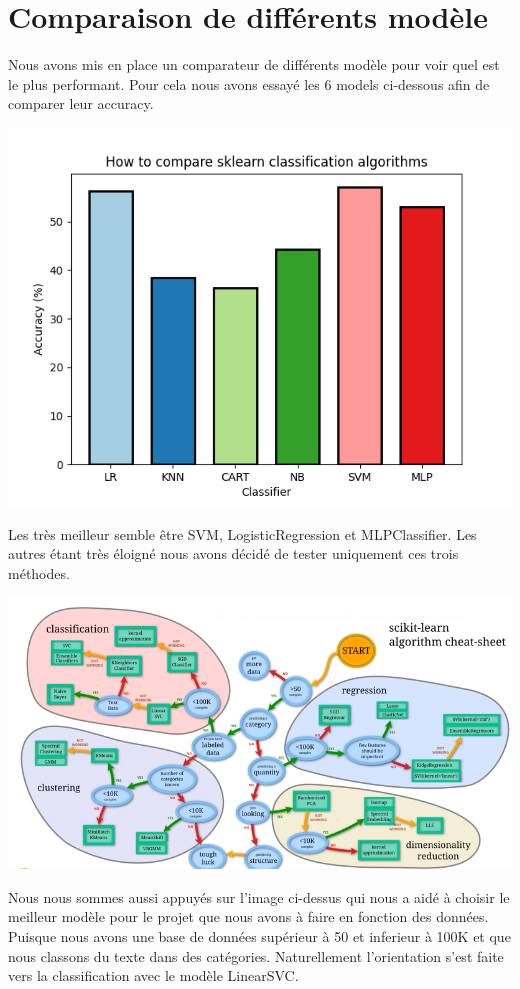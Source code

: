 \section{Comparaison de différents modèle} \label{comparaison}

Nous avons mis en place un comparateur de différents modèle pour voir quel est le plus performant.
Pour cela nous avons essayé les 6 models ci-dessous afin de comparer leur accuracy.


\begin{center}
    \includegraphics[scale=1]{graphs/compare_classifier.png}
\end{center}

Les très meilleur semble être SVM, LogisticRegression et MLPClassifier. Les autres étant très éloigné nous avons décidé de tester uniquement ces trois méthodes.

\begin{center}
    \includegraphics[scale=0.6]{img/sklearn-cheatsheet.png}
\end{center}

Nous nous sommes aussi appuyés sur l'image ci-dessus qui nous a aidé à choisir le meilleur modèle pour le projet que nous avons à faire en fonction des données. Puisque nous avons une base de données supérieur à 50 et inferieur à 100K et que nous classons du texte dans des catégories. Naturellement l'orientation s'est faite vers la classification avec le modèle LinearSVC.